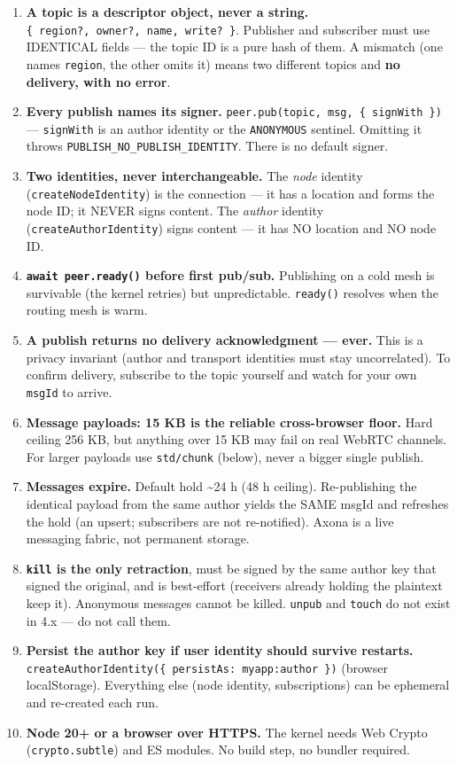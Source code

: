 \documentclass[
  nobib]{tufte-handout}
\providecommand{\tightlist}{%
  \setlength{\itemsep}{0pt}\setlength{\parskip}{0pt}}
\begin{document}
\begin{enumerate}
\def\labelenumi{\arabic{enumi}.}
\tightlist
\item
  \textbf{A topic is a descriptor object, never a string.}
  \texttt{\{\ region?,\ owner?,\ name,\ write?\ \}}. Publisher and
  subscriber must use IDENTICAL fields --- the topic ID is a pure hash
  of them. A mismatch (one names \texttt{region}, the other omits it)
  means two different topics and \textbf{no delivery, with no error}.
\item
  \textbf{Every publish names its signer.}
  \texttt{peer.pub(topic,\ msg,\ \{\ signWith\ \})} ---
  \texttt{signWith} is an author identity or the \texttt{ANONYMOUS}
  sentinel. Omitting it throws \texttt{PUBLISH\_NO\_PUBLISH\_IDENTITY}.
  There is no default signer.
\item
  \textbf{Two identities, never interchangeable.} The \emph{node}
  identity (\texttt{createNodeIdentity}) is the connection --- it has a
  location and forms the node ID; it NEVER signs content. The
  \emph{author} identity (\texttt{createAuthorIdentity}) signs content
  --- it has NO location and NO node ID.
\item
  \textbf{\texttt{await\ peer.ready()} before first pub/sub.} Publishing
  on a cold mesh is survivable (the kernel retries) but unpredictable.
  \texttt{ready()} resolves when the routing mesh is warm.
\item
  \textbf{A publish returns no delivery acknowledgment --- ever.} This
  is a privacy invariant (author and transport identities must stay
  uncorrelated). To confirm delivery, subscribe to the topic yourself
  and watch for your own \texttt{msgId} to arrive.
\item
  \textbf{Message payloads: 15 KB is the reliable cross-browser floor.}
  Hard ceiling 256 KB, but anything over 15 KB may fail on real WebRTC
  channels. For larger payloads use \texttt{std/chunk} (below), never a
  bigger single publish.
\item
  \textbf{Messages expire.} Default hold \textasciitilde24 h (48 h
  ceiling). Re-publishing the identical payload from the same author
  yields the SAME msgId and refreshes the hold (an upsert; subscribers
  are not re-notified). Axona is a live messaging fabric, not permanent
  storage.
\item
  \textbf{\texttt{kill} is the only retraction}, must be signed by the
  same author key that signed the original, and is best-effort
  (receivers already holding the plaintext keep it). Anonymous messages
  cannot be killed. \texttt{unpub} and \texttt{touch} do not exist in
  4.x --- do not call them.
\item
  \textbf{Persist the author key if user identity should survive
  restarts.}
  \texttt{createAuthorIdentity(\{\ persistAs:\ \textquotesingle{}myapp:author\textquotesingle{}\ \})}
  (browser localStorage). Everything else (node identity, subscriptions)
  can be ephemeral and re-created each run.
\item
  \textbf{Node 20+ or a browser over HTTPS.} The kernel needs Web Crypto
  (\texttt{crypto.subtle}) and ES modules. No build step, no bundler
  required.
\end{enumerate}
\end{document}
